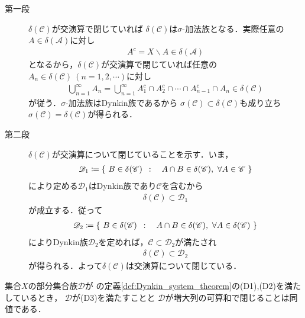 	\begin{prf}\mbox{}
		\begin{description}
			\item[第一段]
				$\delta(\mathscr{C})$が交演算で閉じていれば
				$\delta(\mathscr{C})$は$\sigma$-加法族となる．実際任意の$A \in \delta(\mathscr{A})$に対し
				\begin{align}
					A^c = X \backslash A \in \delta(\mathscr{A})
				\end{align}
				となるから，$\delta(\mathscr{C})$が交演算で閉じていれば任意の
				$A_n \in \delta(\mathscr{C})\ (n=1,2,\cdots)$に対し
				\begin{align}
					\bigcup_{n=1}^{\infty} A_n
					= \bigcup_{n=1}^{\infty} A_1^c \cap A_2^c \cap \cdots \cap A_{n-1}^c \cap A_n
					\in \delta(\mathscr{C})
				\end{align}
				が従う．$\sigma$-加法族はDynkin族であるから
				$\sigma(\mathscr{C}) \subset \delta(\mathscr{C})$も成り立ち
				$\sigma(\mathscr{C}) = \delta(\mathscr{C})$が得られる．
			
			\item[第二段]
				$\delta(\mathscr{C})$が交演算について閉じていることを示す．いま，
				\begin{align}
					\mathscr{D}_1 \coloneqq
					\Set{B \in \delta(\mathscr{C})}{ A \cap B \in \delta(\mathscr{C}),\ 
					\forall A \in \mathscr{C}}
				\end{align}
				により定める$\mathscr{D}_1$はDynkin族であり$\mathscr{C}$を含むから
				\begin{align}
					\delta(\mathscr{C}) \subset \mathscr{D}_1
				\end{align}
				が成立する．従って
				\begin{align}
					\mathscr{D}_2 \coloneqq
					\Set{B \in \delta(\mathscr{C})}{ A \cap B \in \delta(\mathscr{C}),\ 
					\forall A \in \delta(\mathscr{C})}
				\end{align}
				によりDynkin族$\mathscr{D}_2$を定めれば，$\mathscr{C} \subset \mathscr{D}_2$が満たされ
				\begin{align}
					\delta(\mathscr{C}) \subset \mathscr{D}_2
				\end{align}
				が得られる．よって$\delta(\mathscr{C})$は交演算について閉じている．
				\QED
		\end{description}
	\end{prf}
	
	\begin{screen}
		\begin{thm}
			集合$X$の部分集合族$\mathscr{D}$が
			の定義\ref{def:Dynkin_system_theorem}の(D1),(D2)を満たしているとき，
			$\mathscr{D}$が(D3)を満たすことと
			$\mathscr{D}$が増大列の可算和で閉じることは同値である．
		\end{thm}
	\end{screen}
	
